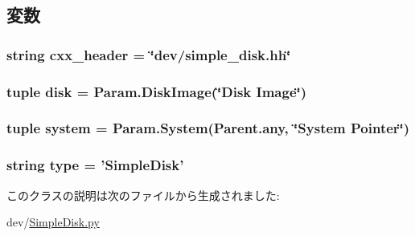 \subsection{変数}
\hypertarget{classSimpleDisk_1_1SimpleDisk_a17da7064bc5c518791f0c891eff05fda}{
\subsubsection[{cxx\_\-header}]{\setlength{\rightskip}{0pt plus 5cm}string {\bf cxx\_\-header} = \char`\"{}dev/simple\_\-disk.hh\char`\"{}}}
\label{classSimpleDisk_1_1SimpleDisk_a17da7064bc5c518791f0c891eff05fda}
\hypertarget{classSimpleDisk_1_1SimpleDisk_a2cb8a7cfa320c243ad28a4ba142879c4}{
\subsubsection[{disk}]{\setlength{\rightskip}{0pt plus 5cm}tuple {\bf disk} = Param.DiskImage(\char`\"{}Disk Image\char`\"{})}}
\label{classSimpleDisk_1_1SimpleDisk_a2cb8a7cfa320c243ad28a4ba142879c4}
\hypertarget{classSimpleDisk_1_1SimpleDisk_ab737471139f5a296e5b26e8a0e1b0744}{
\subsubsection[{system}]{\setlength{\rightskip}{0pt plus 5cm}tuple {\bf system} = Param.System(Parent.any, \char`\"{}System Pointer\char`\"{})}}
\label{classSimpleDisk_1_1SimpleDisk_ab737471139f5a296e5b26e8a0e1b0744}
\hypertarget{classSimpleDisk_1_1SimpleDisk_acce15679d830831b0bbe8ebc2a60b2ca}{
\subsubsection[{type}]{\setlength{\rightskip}{0pt plus 5cm}string {\bf type} = '{\bf SimpleDisk}'}}
\label{classSimpleDisk_1_1SimpleDisk_acce15679d830831b0bbe8ebc2a60b2ca}


このクラスの説明は次のファイルから生成されました:\begin{DoxyCompactItemize}
\item 
dev/\hyperlink{SimpleDisk_8py}{SimpleDisk.py}\end{DoxyCompactItemize}

